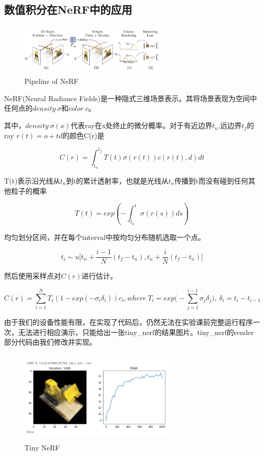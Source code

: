 \documentclass{article}
\begin{document}
	\subsection{数值积分在NeRF中的应用}

\begin{figure}[htbp]
	\centering
	\includegraphics[width=7cm, height=2.5cm]{pipeline.jpg}
	\caption{Pipeline of NeRF}
\end{figure}

NeRF(Neural Radiance Fields)是一种隐式三维场景表示。其将场景表现为空间中任何点的$density\ \sigma$和$color\ c$。

其中，$density\ \sigma(x)$代表ray在x处终止的微分概率。对于有近边界$t_n$,远边界$t_f$的ray $r(t)=o+td$的颜色C(r)是

$$
C(r)=\int_{t_n}^{t_f}T(t)\sigma(r(t))c(r(t),d)dt
$$

T(t)表示沿光线从$t_n$到t的累计透射率，也就是光线从$t_n$传播到t而没有碰到任何其他粒子的概率

$$
T(t)=exp(-\int_{t_n}^t\sigma(r(s))ds)
$$

均匀划分区间，并在每个interval中按均匀分布随机选取一个点。

$$
t_i\sim u\Big[t_n+\frac{i-1}{N}(t_f-t_n),t_n+\frac{i}{N}(t_f-t_n)\Big]
$$

然后使用采样点对$C(r)$进行估计。

$$
C(r)=\sum\limits_{i=1}^{N}T_i(1-exp(-\sigma_i\delta_i))c_i, where\ T_i=exp\Big(-\sum\limits_{j=1}^{i-1}\sigma_j\delta_j\Big),\ \delta_i=t_i-t_{i-1}
$$

由于我们的设备性能有限，在实现了代码后，仍然无法在实验课前完整运行程序一次，无法进行相应演示，只能给出一张tiny\_nerf的结果图片。tiny\_nerf的render部分代码由我们修改并实现。


\begin{figure}[htbp]
	\centering
	\includegraphics[width=7.5cm, height=4.5cm]{NeRF.png}
	\caption{Tiny NeRF}
\end{figure}
\end{document}
